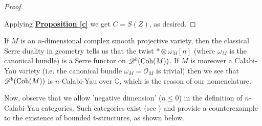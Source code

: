 \begin{proof}
\begin{center}
\end{center}
Applying \hyperref[c]{\textbf{Proposition \ref*{c}}} we get $C=S(Z)$, as desired. 
\end{proof}

\begin{exmp}
If $M$ is an $n$-dimensional complex smooth projective variety, then the classical Serre duality in geometry tells us that the twist $* \otimes \omega_M[n]$ (where $\omega_M$ is the canonical bundle) is a Serre functor on $\mathscr{D}^b(\textnormal{Coh}(M))$. If $M$ is moreover a Calabi-Yau variety (i.e. the canonical bundle $\omega_M=\mathcal{O}_M$ is trivial) then we see that $\mathscr{D}^b(\textnormal{Coh}(M))$ is $n$-Calabi-Yau over $\mathbb{C}$, which is the reason of our nomenclature.  
\end{exmp}
%
%
%

Now, observe that we allow 'negative dimension' ($n \le 0$) in the definition of $n$-Calabi-Yau categories. Such categories exist (see \cite{hol}) and provide a counterexample to the existence of bounded t-structures, as shown below. 

